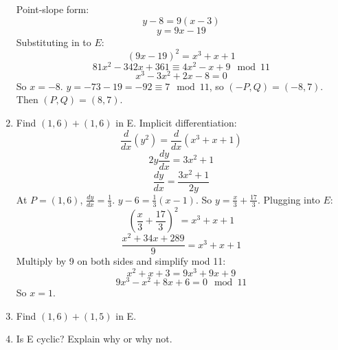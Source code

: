 \documentclass[12pt]{article}
\begin{document}
\begin{enumerate}
    \newline Point-slope form: $$y-8=9(x-3)$$ $$y=9x-19$$
    \newline Substituting in to $E$: $$(9x-19)^2=x^3+x+1$$ $$81x^2-342x+361\equiv4x^2-x+9\mod{11}$$ $$x^3-3x^2+2x-8=0$$ So $x=-8$. $y=-73-19=-92\equiv7\mod{11}$, so $(-P,Q)=(-8,7)$. Then $(P,Q)=(8,7)$.
    \item Find $(1,6)+(1,6)$ in E.
    \newline Implicit differentiation: $$\frac{d}{dx}(y^2)=\frac{d}{dx}(x^3+x+1)$$ $$2y\frac{dy}{dx}=3x^2+1$$ $$\frac{dy}{dx}=\frac{3x^2+1}{2y}$$ At $P=(1,6)$, $\frac{dy}{dx}=\frac{1}{3}$. $y-6=\frac{1}{3}(x-1)$. So $y=\frac{x}{3}+\frac{17}{3}$. Plugging into $E$: $$(\frac{x}{3}+\frac{17}{3})^2=x^3+x+1$$ $$\frac{x^2+34x+289}{9}=x^3+x+1$$Multiply by 9 on both sides and simplify mod 11:$$x^2+x+3=9x^3+9x+9$$ $$9x^3-x^2+8x+6=0\mod{11}$$ So $x=1$. \newline\scalebox{3}{I'm confused :(}
    \item Find $(1,6)+(1,5)$ in E.
    \item Is E cyclic? Explain why or why not.
\end{enumerate}
\end{document}
